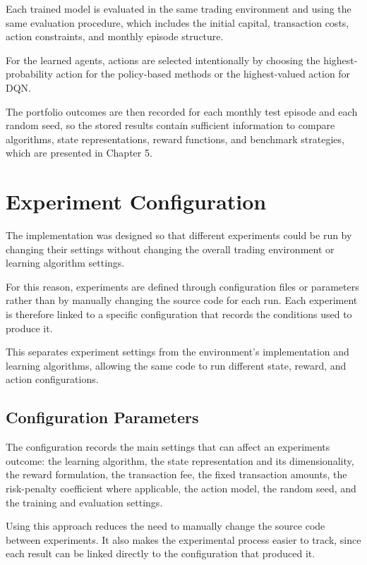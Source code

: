 Each trained model is evaluated in the same trading environment and
using the same evaluation procedure, which includes the initial capital,
transaction costs, action constraints, and monthly episode structure.

For the learned agents, actions are selected intentionally by choosing
the highest-probability action for the policy-based methods or the
highest-valued action for DQN.

The portfolio outcomes are then recorded for each monthly test episode
and each random seed, so the stored results contain sufficient
information to compare algorithms, state representations, reward
functions, and benchmark strategies, which are presented in Chapter 5.

\section{Experiment Configuration}

The implementation was designed so that different experiments could be
run by changing their settings without changing the overall trading
environment or learning algorithm settings.

For this reason, experiments are defined through configuration files or
parameters rather than by manually changing the source code for each
run. Each experiment is therefore linked to a specific configuration
that records the conditions used to produce it.

This separates experiment settings from the environment's implementation
and learning algorithms, allowing the same code to run different state,
reward, and action configurations.

\subsection{Configuration Parameters}

The configuration records the main settings that can affect an
experiment\textquotesingle s outcome: the learning algorithm, the state
representation and its dimensionality, the reward formulation, the
transaction fee, the fixed transaction amounts, the risk-penalty
coefficient where applicable, the action model, the random seed, and the
training and evaluation settings.

Using this approach reduces the need to manually change the source code
between experiments. It also makes the experimental process easier to
track, since each result can be linked directly to the configuration
that produced it.

